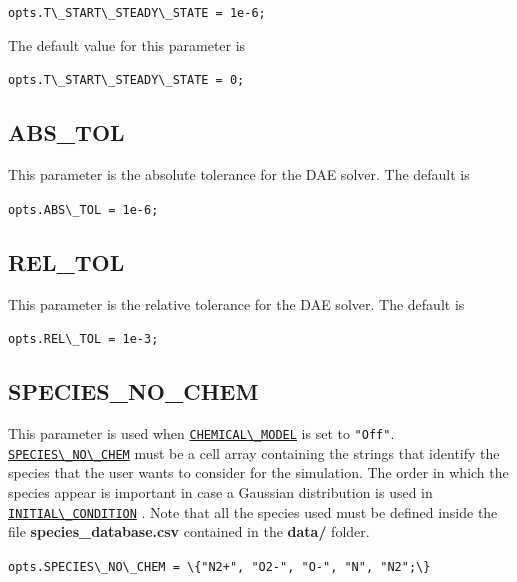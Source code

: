 \documentclass[12pt,a4paper]{article}
\newcommand{\matlabs}[1]{{\lstinline[style=MatlabStyle]!#1!}}
\newcommand{\seclink}[2]{%
	\begingroup
	\hypersetup{linkcolor=orange}%
	\hyperref[sec:#1]{\matlabs{#2}}%
	\endgroup
}
\begin{document}
	\matlabs{opts.T\_START\_STEADY\_STATE = 1e-6;}
	
	\noindent The default value for this parameter is
	
	\matlabs{opts.T\_START\_STEADY\_STATE = 0;}
	
	\subsection{ABS\_TOL}
	\label{sec:abstol}
	This parameter is the absolute tolerance for the DAE solver. The default is
	
	\matlabs{opts.ABS\_TOL = 1e-6;}
	
	\subsection{REL\_TOL}
	\label{sec:reltol}
	This parameter is the relative tolerance for the DAE solver. The default is
	
	\matlabs{opts.REL\_TOL = 1e-3;}
	
	\subsection{SPECIES\_NO\_CHEM}
	\label{sec:speciesnochem}
	This parameter is used when \seclink{chemicalmodel}{CHEMICAL\_MODEL} is set to \matlabs{"Off"}.
	\seclink{speciesnochem}{SPECIES\_NO\_CHEM} must be a cell array containing the strings that identify the species that the user wants to consider for the simulation. The order in which the species appear is important in case a Gaussian distribution is used in \seclink{initial}{INITIAL\_CONDITION}. Note that all the species used must be defined inside the file \textbf{species\_database.csv} contained in the \textbf{data/} folder.
	
	\matlabs{opts.SPECIES\_NO\_CHEM = \{"N2+", "O2-", "O-", "N", "N2";\}}
	
		
\end{document}
